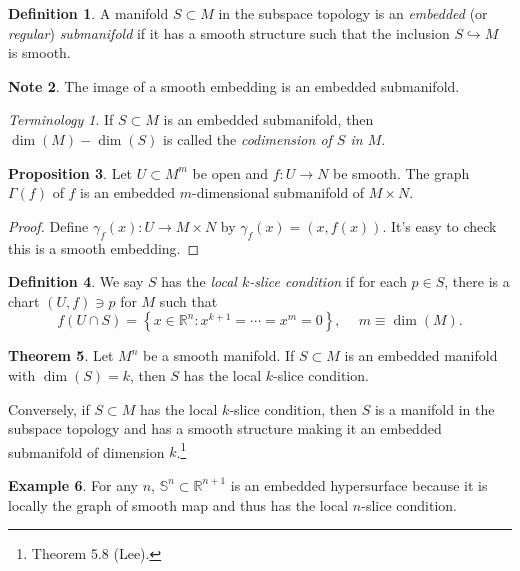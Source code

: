 \documentclass[10pt,letterpaper,cm]{nupset}
\theoremstyle{definition}
\newtheorem{definition}{Definition}[subsection]
\newtheorem{exmp}[definition]{Example}
\newtheorem{note}[definition]{Note}
\theoremstyle{theorem}
\newtheorem{theorem}[definition]{Theorem}
\newtheorem{prop}[definition]{Proposition}
\theoremstyle{remark}
\newtheorem*{term}{Terminology}
\newcommand{\R}{\mathbb R}
\renewcommand{\S}{\mathbb S}
\newcommand{\1}{\mathbf{1}}
\newcommand{\0}{\vec 0}
\begin{document}
\begin{definition}
A manifold $ S\subset M$ in the subspace topology is an \textit{embedded} (or \textit{regular}) \textit{submanifold} if it has a smooth structure such that the inclusion $S \hookrightarrow M$ is smooth.
\end{definition}

\begin{note}
The image of a smooth embedding is an embedded submanifold.
\end{note}

\begin{term}
If $S \subset M$ is an embedded submanifold, then $\dim(M) - \dim(S)$ is called the \textit{codimension of $S$ in $M$}.
\end{term}

\begin{prop}
Let $U \subset M^m$ be open and $f: U \to N$ be smooth. The graph $\Gamma(f)$ of $f$ is an embedded $m$-dimensional submanifold of $M \times N$.
\end{prop}
\begin{proof}
Define $\gamma_f(x) : U \to M \times N$ by $\gamma_f(x) = \left(x, f(x)\right)$. It's easy to check this is a smooth embedding.
\end{proof}

\begin{definition}
We say $S$ has the \textit{local $k$-slice condition} if for each $p\in S$, there is a chart $(U, f)\ni p$ for $M$ such that $$f(U \cap S) = \left\{x\in \R^n : x^{k+1} = \cdots = x^m = 0\right\}, \ \quad m \equiv \dim(M). $$ 
\end{definition}

\begin{theorem}\label{slice}
Let $M^n$ be a smooth manifold. If $S\subset M$ is an embedded manifold with $\dim(S) = k$, then $S$ has the local $k$-slice condition. 

Conversely, if $S\subset M$ has the local $k$-slice condition, then $S$ is a manifold in the subspace topology and has a smooth structure making it an embedded submanifold of dimension $k$.\footnote{Theorem 5.8 (Lee).}%
\end{theorem}

\begin{exmp}
For any $n$, $\S^n \subset \R^{n+1}$ is an embedded hypersurface because it is locally the graph of smooth map and thus has the local $n$-slice condition.
\end{exmp}
\end{document}
